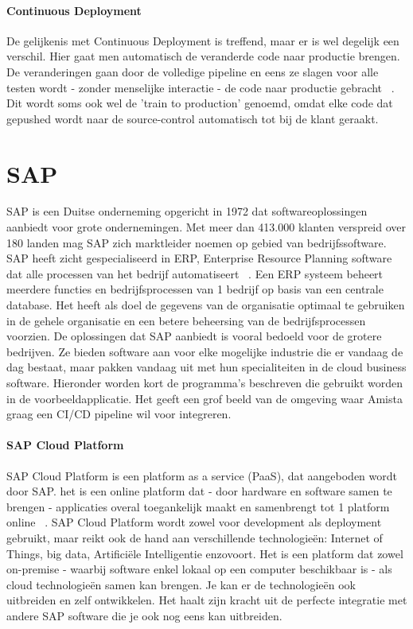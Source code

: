     \paragraph{Continuous Deployment}
    De gelijkenis met Continuous Deployment is treffend, maar er is wel degelijk een verschil.
    Hier gaat men automatisch de veranderde code naar productie brengen. De veranderingen gaan door de volledige pipeline en eens ze slagen voor alle testen wordt - zonder menselijke interactie - de code naar productie gebracht ~\autocite{Claps2015}.
    Dit wordt soms ook wel de 'train to production' genoemd, omdat elke code dat gepushed wordt naar de source-control automatisch tot bij de klant geraakt.

\section{SAP}
\label{sec:sap}
    SAP is een Duitse onderneming opgericht in 1972 dat softwareoplossingen aanbiedt voor grote ondernemingen. Met meer dan 413.000 klanten verspreid over 180 landen mag SAP zich marktleider noemen op gebied van bedrijfssoftware.
    SAP heeft zicht gespecialiseerd in ERP, Enterprise Resource Planning software dat alle processen van het bedrijf automatiseert ~\autocite{SAPERP2019}. Een ERP systeem beheert meerdere functies en bedrijfsprocessen van 1 bedrijf op basis van een centrale database. Het heeft als doel de gegevens van de organisatie optimaal te gebruiken in de gehele organisatie en een betere beheersing van de bedrijfsprocessen voorzien.
    De oplossingen dat SAP aanbiedt is vooral bedoeld voor de grotere bedrijven. Ze bieden software aan voor elke mogelijke industrie die er vandaag de dag bestaat, maar pakken vandaag uit met hun specialiteiten in de cloud business software.
    Hieronder worden kort de programma's beschreven die gebruikt worden in de voorbeeldapplicatie. Het geeft een grof beeld van de omgeving waar Amista graag een CI/CD pipeline wil voor integreren.
     
    \paragraph{SAP Cloud Platform}
    SAP Cloud Platform is een platform as a service (PaaS), dat aangeboden wordt door SAP. het is een online platform dat - door hardware en software samen te brengen - applicaties overal toegankelijk maakt en samenbrengt tot 1 platform online ~\autocite{SAPSE2018}.
    SAP Cloud Platform wordt zowel voor development als deployment gebruikt, maar reikt ook de hand aan verschillende technologieën: Internet of Things, big data, Artificiële Intelligentie enzovoort. Het is een platform dat zowel on-premise - waarbij software enkel lokaal op een computer beschikbaar is - als cloud technologieën samen kan brengen. Je kan er de technologieën ook uitbreiden en zelf ontwikkelen. Het haalt zijn kracht uit de perfecte integratie met andere SAP software die je ook nog eens kan uitbreiden.
    
